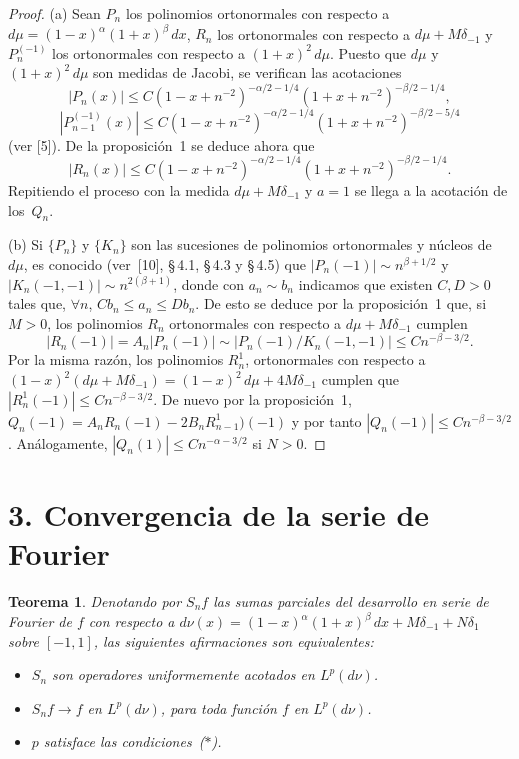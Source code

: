 \documentclass[a4paper,12pt]{article}
\theoremstyle{plain}
\newtheorem*{teo}{Teorema}
\theoremstyle{definition}
\newcommand{\parrafo}[1]{\section*{\large #1}}
\begin{document}
\begin{proof}
(a) Sean $P_{n}$ los polinomios ortonormales con respecto a
$d\mu = (1-x)^{\alpha}(1+x)^{\beta}\,dx$,
$R_{n}$ los ortonormales con respecto a $d\mu + M\delta_{-1}$
y $P_{n}^{(-1)}$ los ortonormales con respecto a $(1+x)^{2}\,d\mu$.
Puesto que $d\mu$ y $(1+x)^{2}\,d\mu$ son medidas de Jacobi,
se verifican las acotaciones
$$
|P_{n}(x)| \leq C (1-x + n^{-2})^{-\alpha/2-1/4}
(1+x + n^{-2})^{-\beta/2-1/4},
$$
$$
|P_{n-1}^{(-1)}(x)| \leq C (1-x + n^{-2})^{-\alpha/2-1/4}
(1+x + n^{-2})^{-\beta/2-5/4}
$$
(ver [5]). De la proposici\'on~1 se deduce ahora que
$$
|R_{n}(x)| \leq C (1-x + n^{-2})^{-\alpha/2-1/4}
(1+x + n^{-2})^{-\beta/2-1/4}.
$$
Repitiendo el proceso con la medida $d\mu+M\delta_{-1}$
y $a = 1$ se llega a la acotaci\'on de los~$Q_{n}$.

(b) Si $\{P_{n}\}$ y $\{K_{n}\}$ son las sucesiones de polinomios ortonormales
y n\'ucleos de $d\mu$, es conocido (ver~[10], {\S}\,4.1, {\S}\,4.3
y {\S}\,4.5) que $|P_{n}(-1)| \sim n^{\beta+1/2}$
y $|K_{n}(-1,-1)| \sim n^{2(\beta+1)}$,
donde con $a_{n}\sim b_{n}$ indicamos que
existen $C,D > 0$ tales que, $\forall n$,
$C b_{n} \leq a_{n} \leq D b_{n}$.
De esto se deduce por la proposici\'on~1 que, si $M > 0$,
los polinomios $R_{n}$ ortonormales con respecto a $d\mu+M\delta_{-1}$
cumplen
$$
|R_{n}(-1)| = A_{n}|P_{n}(-1)| \sim |P_{n}(-1)/K_{n}(-1,-1)|
\leq Cn^{-\beta-3/2}.
$$
Por la misma raz\'on, los polinomios $R_{n}^{1}$, ortonormales
con respecto a $(1-x)^{2}(d\mu+M\delta_{-1}) = (1-x)^{2}\,d\mu+4M\delta_{-1}$
cumplen que $|R_{n}^{1}(-1)| \leq Cn^{-\beta-3/2}$.
De nuevo por la proposici\'on~1,
$Q_{n}(-1) = A_{n}R_{n}(-1) - 2 B_{n}R_{n-1}^{1})(-1)$
y por tanto $|Q_{n}(-1)| \leq Cn^{-\beta-3/2}$.
An\'alogamente, $|Q_{n}(1)| \leq C n^{-\alpha-3/2}$
si $N > 0$.
\end{proof}

\parrafo{3. Convergencia de la serie de Fourier}

\begin{teo}
Denotando por $S_{n}f$ las sumas parciales del desarrollo
en serie de Fourier de $f$ con respecto a $d\nu(x) = (1-x)^{\alpha}(1+x)^{\beta}\,dx
+ M\delta_{-1} + N\delta_{1}$ sobre $[-1,1]$, las siguientes
afirmaciones son equivalentes:
\begin{itemize}
\item[(i)] $S_{n}$ son operadores uniformemente acotados en $L^{p}(d\nu)$.

\item[(ii)] $S_{n}f \to f$ en $L^{p}(d\nu)$, para toda funci\'on $f$ en $L^{p}(d\nu)$.

\item[(iii)] $p$ satisface las condiciones~($*$).
\end{itemize}
\end{teo}
\end{document}
